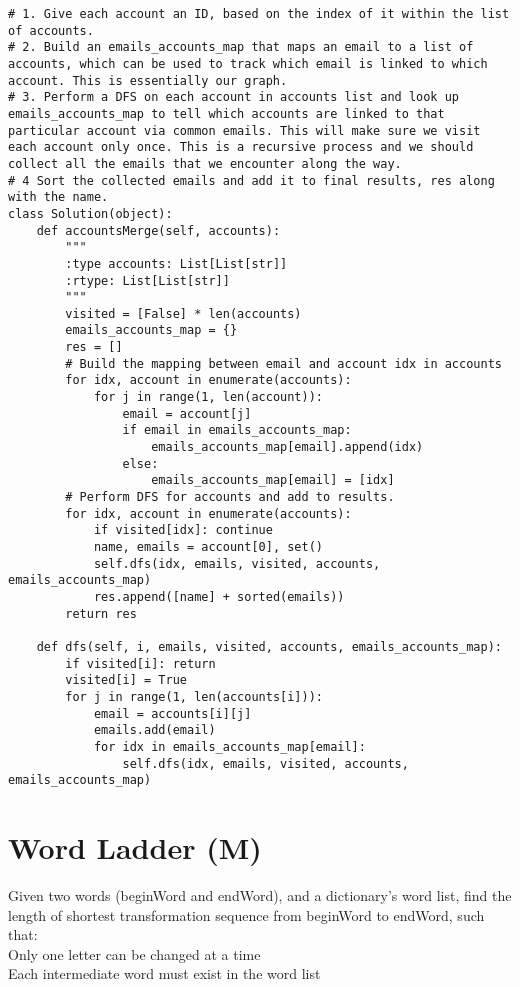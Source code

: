 \begin{lstlisting}
# 1. Give each account an ID, based on the index of it within the list of accounts.
# 2. Build an emails_accounts_map that maps an email to a list of accounts, which can be used to track which email is linked to which account. This is essentially our graph.
# 3. Perform a DFS on each account in accounts list and look up emails_accounts_map to tell which accounts are linked to that particular account via common emails. This will make sure we visit each account only once. This is a recursive process and we should collect all the emails that we encounter along the way.
# 4 Sort the collected emails and add it to final results, res along with the name.
class Solution(object):
    def accountsMerge(self, accounts):
        """
        :type accounts: List[List[str]]
        :rtype: List[List[str]]
        """
        visited = [False] * len(accounts)
        emails_accounts_map = {}
        res = []
        # Build the mapping between email and account idx in accounts
        for idx, account in enumerate(accounts):
            for j in range(1, len(account)):
                email = account[j]
                if email in emails_accounts_map:
                    emails_accounts_map[email].append(idx)
                else:
                    emails_accounts_map[email] = [idx]
        # Perform DFS for accounts and add to results.
        for idx, account in enumerate(accounts):
            if visited[idx]: continue
            name, emails = account[0], set()
            self.dfs(idx, emails, visited, accounts, emails_accounts_map)
            res.append([name] + sorted(emails))
        return res
    
    def dfs(self, i, emails, visited, accounts, emails_accounts_map):
        if visited[i]: return
        visited[i] = True
        for j in range(1, len(accounts[i])):
            email = accounts[i][j]
            emails.add(email)
            for idx in emails_accounts_map[email]:
                self.dfs(idx, emails, visited, accounts, emails_accounts_map)
\end{lstlisting}

\section{Word Ladder (M)}
Given two words (beginWord and endWord), and a dictionary's word list, find the length of shortest transformation sequence from beginWord to endWord, such that:\\
    Only one letter can be changed at a time\\
    Each intermediate word must exist in the word list\\


